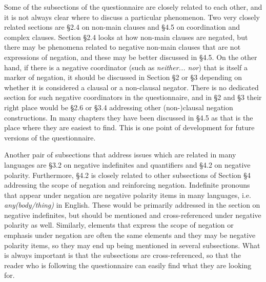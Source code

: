\documentclass[output=paper,colorlinks,citecolor=brown]{langscibook}
\begin{document}
Some of the subsections of the questionnaire are closely related to each other, and it is not always clear where to discuss a particular phenomenon. Two very closely related sections are §2.4 on non-main clauses and §4.5 on coordination and complex clauses. Section §2.4 looks at how non-main clauses are negated, but there may be phenomena related to negative non-main clauses that are not expressions of negation, and these may be better discussed in §4.5. On the other hand, if there is a negative coordinator (such as \textit{neither... nor}) that is itself a marker of negation, it should be discussed in Section §2 or §3 depending on whether it is considered a clausal or a non-clausal negator. There is no dedicated section for such negative coordinators in the questionnaire, and in §2 and §3 their right place would be §2.6 or §3.4 addressing other (non-)clausal negation constructions. In many chapters they have been discussed in §4.5 as that is the place where they are easiest to find. This is one point of development for future versions of the questionnaire. 

Another pair of subsections that address issues which are related in many languages are §3.2 on negative indefinites and quantifiers and §4.2 on negative polarity. Furthermore, §4.2 is closely related to other subsections of Section §4 addressing the scope of negation and reinforcing negation. Indefinite pronouns that appear under negation are negative polarity items in many languages, i.e. \textit{any(body/thing)} in English. These would be primarily addressed in the section on negative indefinites, but should be mentioned and cross-referenced under negative polarity as well. Similarly, elements that express the scope of negation or emphasis under negation are often the same elements and they may be negative polarity items, so they may end up being mentioned in several subsections. What is always important is that the subsections are cross-referenced, so that the reader who is following the questionnaire can easily find what they are looking for.
\end{document}
